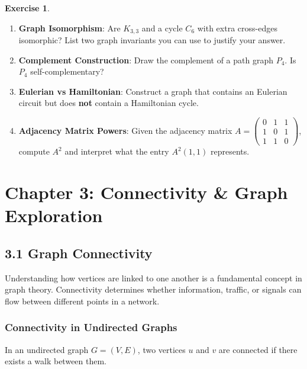 \documentclass[
]{book}
\providecommand{\tightlist}{%
  \setlength{\itemsep}{0pt}\setlength{\parskip}{0pt}}
\theoremstyle{definition}
\theoremstyle{definition}
\theoremstyle{definition}
\newtheorem{exercise}{Exercise}[chapter]
\theoremstyle{definition}
\theoremstyle{remark}
\begin{document}
\begin{exercise}
\protect\hypertarget{exr:unnamed-chunk-21}{}\label{exr:unnamed-chunk-21}\leavevmode

\begin{enumerate}
\def\labelenumi{\arabic{enumi}.}
\tightlist
\item
  \textbf{Graph Isomorphism}: Are \(K_{3,3}\) and a cycle \(C_6\) with extra cross-edges isomorphic? List two graph invariants you can use to justify your answer.
\item
  \textbf{Complement Construction}: Draw the complement of a path graph \(P_4\). Is \(P_4\) self-complementary?
\item
  \textbf{Eulerian vs Hamiltonian}: Construct a graph that contains an Eulerian circuit but does \textbf{not} contain a Hamiltonian cycle.
\item
  \textbf{Adjacency Matrix Powers}: Given the adjacency matrix \(A = \begin{pmatrix} 0 & 1 & 1 \\ 1 & 0 & 1 \\ 1 & 1 & 0 \end{pmatrix}\), compute \(A^2\) and interpret what the entry \(A^2(1, 1)\) represents.
\end{enumerate}

\end{exercise}

\chapter{Chapter 3: Connectivity \& Graph Exploration}\label{chapter-3-connectivity-graph-exploration}

\section{3.1 Graph Connectivity}\label{graph-connectivity}

Understanding how vertices are linked to one another is a fundamental concept in graph theory. Connectivity determines whether information, traffic, or signals can flow between different points in a network.

\subsection{Connectivity in Undirected Graphs}\label{connectivity-in-undirected-graphs}

In an undirected graph \(G = (V, E)\), two vertices \(u\) and \(v\) are connected if there exists a walk between them.
\end{document}
